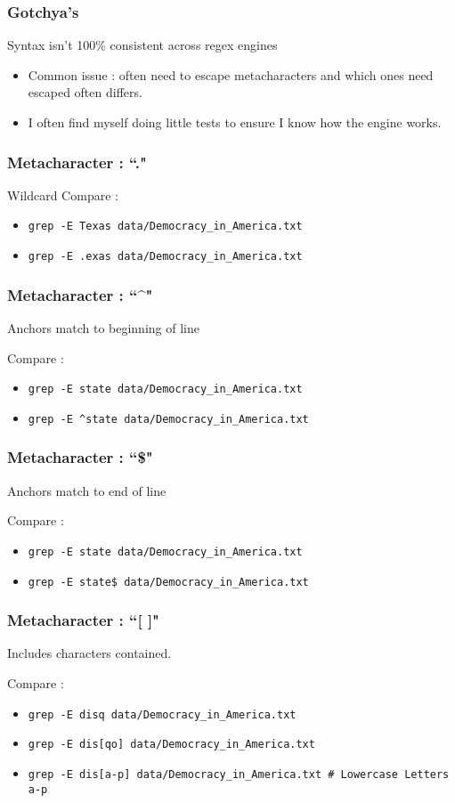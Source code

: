 \documentclass{beamer}
\newcommand{\code}[1]{\colorbox{codegray}{\texttt{#1}}}
\begin{document}
\begin{frame}
\frametitle{Gotchya's}
Syntax isn't 100\% consistent across regex engines
\begin{itemize}
    \item Common issue : often need to escape metacharacters and which ones need escaped often differs.
    \pause
    \item I often find myself doing little tests to ensure I know how the engine works.
\end{itemize}
\end{frame}

\begin{frame}
\frametitle{Metacharacter : ``."}
Wildcard
\bigskip
Compare :
\begin{itemize}
    \item \code{grep -E Texas data/Democracy\_in\_America.txt}
    \pause
    \item \code{grep -E .exas data/Democracy\_in\_America.txt}
\end{itemize}
\end{frame}


\begin{frame}
\frametitle{Metacharacter : ``\^{}"}
Anchors match to beginning of line
\bigskip

Compare :
\begin{itemize}
    \item \code{grep -E state data/Democracy\_in\_America.txt}
    \pause
    \item \code{grep -E \^{}state data/Democracy\_in\_America.txt}
\end{itemize}
\end{frame}

\begin{frame}
\frametitle{Metacharacter : ``\$"}
Anchors match to end of line
\bigskip

Compare :
\begin{itemize}
    \item \code{grep -E state data/Democracy\_in\_America.txt}
    \pause
    \item \code{grep -E state\$ data/Democracy\_in\_America.txt}
\end{itemize}
\end{frame}

\begin{frame}
\frametitle{Metacharacter : ``[ ]"}
Includes characters contained. 
\bigskip

Compare :
\begin{itemize}
    \item \code{grep -E disq data/Democracy\_in\_America.txt}
    \pause
    \item \code{grep -E dis[qo] data/Democracy\_in\_America.txt}
    \pause
    \item \code{grep -E dis[a-p] data/Democracy\_in\_America.txt \# Lowercase Letters a-p}   
\end{itemize}
\end{frame}
\end{document}
